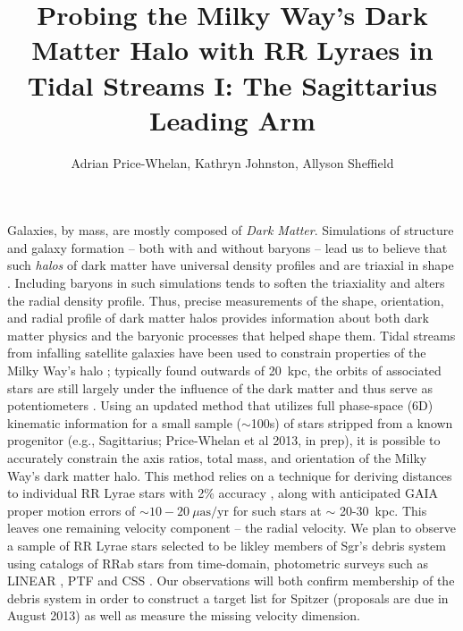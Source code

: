 \documentclass[preprint]{aastex}
\begin{document}
\title{Probing the Milky Way's Dark Matter Halo with RR Lyraes in Tidal Streams I: The Sagittarius Leading Arm}
\author{Adrian Price-Whelan, Kathryn Johnston, Allyson Sheffield}
Galaxies, by mass, are mostly composed of \emph{Dark Matter}. Simulations of structure and galaxy formation -- both with
and without baryons -- lead us to believe that such \emph{halos} of
dark matter have universal density profiles \citep{nfw96} and are triaxial
in shape \citep{jing02}. Including baryons in such simulations tends to
soften the triaxiality and alters the radial density profile. Thus,
precise measurements of the shape, orientation, and radial profile of
dark matter halos provides information about both dark matter physics
and the baryonic processes that helped shape them. Tidal streams from
infalling satellite galaxies have been used to constrain properties of
the Milky Way's halo \citep[e.g.][]{law10}; typically found outwards of 20~kpc, the
orbits of associated stars are still largely under the influence of
the dark matter and thus serve as potentiometers \citep[e.g.][]{johnston99}. Using an updated
method that utilizes full phase-space (6D) kinematic information for a
small sample ($\sim$100s) of stars stripped from a known progenitor
(e.g., Sagittarius; Price-Whelan et al 2013, in prep), it is
possible to accurately constrain the axis ratios, total mass, and
orientation of the Milky Way's dark matter halo. This method relies on a technique for deriving
distances to individual RR Lyrae stars with 2\% accuracy \citep{},
along with anticipated GAIA proper motion errors of
$\sim10-20~\mu\mathrm{as}/\mathrm{yr}$ for such stars at $\sim$
20-30~kpc. This leaves one remaining velocity component -- the radial
velocity.  We plan to observe a
sample of RR Lyrae stars selected to be likley members of Sgr's debris system 
using catalogs of RRab stars from
time-domain, photometric surveys such as LINEAR \citep{}, PTF \citep{}
and CSS \citep{}. 
Our observations will both confirm membership of the debris system in order to construct a target list for Spitzer (proposals are due in August 2013) as well
as measure the missing velocity dimension.
\end{document}
